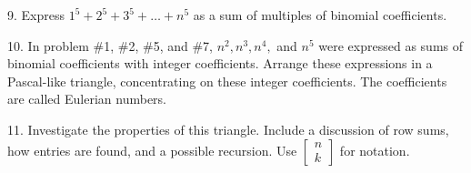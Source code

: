 \documentclass[10pt,]{book}
\theoremstyle{plain}
\theoremstyle{definition}
\theoremstyle{definition}
\numberwithin{equation}{chapter}
\begin{document}
\begin{exerciselist}
\item[9.]\hypertarget{exercise-107}{}\hypertarget{p-247}{}%
Express \(1^{5} + 2^{5} + 3^{5} + \ldots + n^{5}\) as a sum of multiples of binomial coefficients.%
\par\smallskip
\item[10.]\hypertarget{exercise-108}{}\hypertarget{p-248}{}%
In problem \#1, \#2, \#5, and \#7, \(n^{2},n^{3},n^{4},\) and \(n^{5}\) were expressed as sums of binomial coefficients with integer coefficients. Arrange these expressions in a Pascal-like triangle, concentrating on these integer coefficients. The coefficients are called Eulerian numbers.%
\par\smallskip
\item[11.]\hypertarget{exercise-109}{}\hypertarget{p-249}{}%
Investigate the properties of this triangle. Include a discussion of row sums, how entries are found, and a possible recursion. Use \(\begin{bmatrix}
n\\
k
\end{bmatrix}\) for notation.%
\par\smallskip
\end{exerciselist}
\typeout{************************************************}
\typeout{************************************************}
\end{document}
